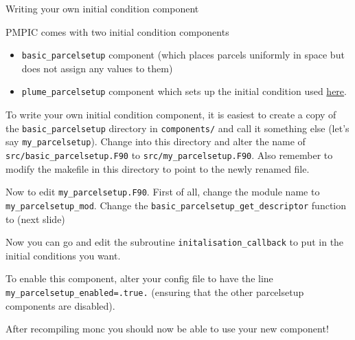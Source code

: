 \documentclass{beamer}
\newenvironment{Shaded}{}{}
\newcommand{\KeywordTok}[1]{\textcolor[rgb]{0.13,0.29,0.53}{\textbf{{#1}}}}
\newcommand{\DataTypeTok}[1]{\textcolor[rgb]{0.13,0.29,0.53}{{#1}}}
\newcommand{\FloatTok}[1]{\textcolor[rgb]{0.00,0.00,0.81}{{#1}}}
\newcommand{\StringTok}[1]{\textcolor[rgb]{0.31,0.60,0.02}{{#1}}}
\newcommand{\OperatorTok}[1]{\textcolor[rgb]{0.81,0.36,0.00}{\textbf{{#1}}}}
\newcommand{\NormalTok}[1]{{#1}}
\begin{document}
\begin{frame}[fragile]{Writing your own initial condition component}
\protect\hypertarget{writing-your-own-initial-condition-component}{}

PMPIC comes with two initial condition components
\begin{itemize}
\item \texttt{basic\_parcelsetup} component (which places parcels uniformly in
space but does not assign any values to them)
\item \texttt{plume\_parcelsetup} component which sets up the initial
condition used
\href{https://rmets.onlinelibrary.wiley.com/doi/10.1002/qj.3319}{here}.
\end{itemize}

To write your own initial condition component, it is easiest to create a
copy of the \texttt{basic\_parcelsetup} directory in
\texttt{components/} and call it something else (let's say
\texttt{my\_parcelsetup}). Change into this directory and alter the name
of \texttt{src/basic\_parcelsetup.F90} to
\texttt{src/my\_parcelsetup.F90}. Also remember to modify the makefile
in this directory to point to the newly renamed file.

Now to edit \texttt{my\_parcelsetup.F90}. First of all, change the
module name to \texttt{my\_parcelsetup\_mod}. Change the
\texttt{basic\_parcelsetup\_get\_descriptor} function to (next slide)
\end{frame}

\begin{frame}[fragile]

\begin{footnotesize}
\begin{Shaded}
\end{Shaded}
\end{footnotesize}

Now you can go and edit the subroutine \texttt{initalisation\_callback}
to put in the initial conditions you want.

To enable this component, alter your config file to have the line
\texttt{my\_parcelsetup\_enabled=.true.} (ensuring that the other
parcelsetup components are disabled).

After recompiling monc you should now be able to use your new component!

\end{frame}
\end{document}
